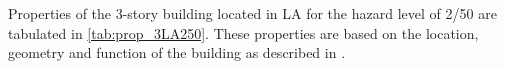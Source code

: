\documentclass{simcenterdocumentation}
\newcommand{\ft}{\ensuremath{\,\mathrm{ft}}}
\newcommand{\m}{\ensuremath{\,\mathrm{m}}}
\begin{document}

Properties of the 3-story building located in LA for the hazard level of 2/50 are tabulated in \cref{tab:prop_3LA250}. These properties are based on the location, geometry and function of the building as described in \cite{FEMA335c2000}.
\end{document}
